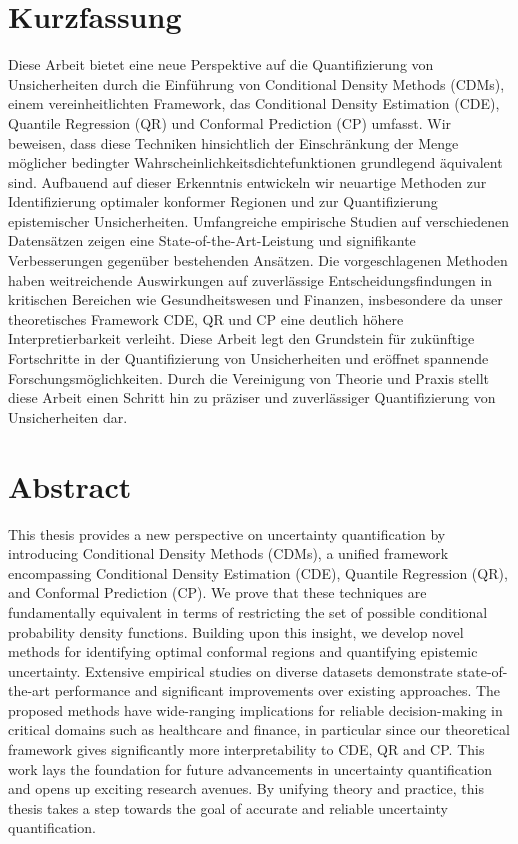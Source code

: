 
{%
	\chapter*{Kurzfassung}
	
	Diese Arbeit bietet eine neue Perspektive auf die Quantifizierung von Unsicherheiten durch die Einführung von Conditional Density Methods (CDMs), einem vereinheitlichten Framework, das Conditional Density Estimation (CDE), Quantile Regression (QR) und Conformal Prediction (CP) umfasst. Wir beweisen, dass diese Techniken hinsichtlich der Einschränkung der Menge möglicher bedingter Wahrscheinlichkeitsdichtefunktionen grundlegend äquivalent sind. Aufbauend auf dieser Erkenntnis entwickeln wir neuartige Methoden zur Identifizierung optimaler konformer Regionen und zur Quantifizierung epistemischer Unsicherheiten. Umfangreiche empirische Studien auf verschiedenen Datensätzen zeigen eine State-of-the-Art-Leistung und signifikante Verbesserungen gegenüber bestehenden Ansätzen. Die vorgeschlagenen Methoden haben weitreichende Auswirkungen auf zuverlässige Entscheidungsfindungen in kritischen Bereichen wie Gesundheitswesen und Finanzen, insbesondere da unser theoretisches Framework CDE, QR und CP eine deutlich höhere Interpretierbarkeit verleiht. Diese Arbeit legt den Grundstein für zukünftige Fortschritte in der Quantifizierung von Unsicherheiten und eröffnet spannende Forschungsmöglichkeiten. Durch die Vereinigung von Theorie und Praxis stellt diese Arbeit einen Schritt hin zu präziser und zuverlässiger Quantifizierung von Unsicherheiten dar.
}

{%
	\chapter*{Abstract}
	
	This thesis provides a new perspective on uncertainty quantification by introducing Conditional Density Methods (CDMs), a unified framework encompassing Conditional Density Estimation (CDE), Quantile Regression (QR), and Conformal Prediction (CP). We prove that these techniques are fundamentally equivalent in terms of restricting the set of possible conditional probability density functions. Building upon this insight, we develop novel methods for identifying optimal conformal regions and quantifying epistemic uncertainty. Extensive empirical studies on diverse datasets demonstrate state-of-the-art performance and significant improvements over existing approaches. The proposed methods have wide-ranging implications for reliable decision-making in critical domains such as healthcare and finance, in particular since our theoretical framework gives significantly more interpretability to CDE, QR and CP. This work lays the foundation for future advancements in uncertainty quantification and opens up exciting research avenues. By unifying theory and practice, this thesis takes a step towards the goal of accurate and reliable uncertainty quantification.
}
